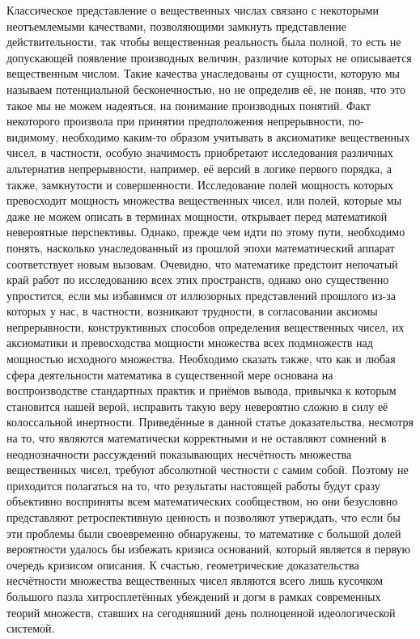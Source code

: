 \documentclass[12pt]{article}
\begin{document}
Классическое представление о вещественных числах связано с некоторыми неотъемлемыми качествами, позволяющими замкнуть представление действительности, так чтобы вещественная реальность была полной, то есть не допускающей появление производных величин, различие которых не описывается вещественным числом. Такие качества унаследованы от сущности, которую мы называем потенциальной бесконечностью, но не определив её, не поняв, что это такое мы не можем надеяться, на понимание производных понятий. Факт некоторого произвола при принятии предположения непрерывности, по-видимому, необходимо каким-то образом учитывать в аксиоматике вещественных чисел, в частности, особую значимость приобретают исследования различных альтернатив непрерывности, например, её версий в логике первого порядка, а также, замкнутости и совершенности. Исследование полей мощность которых превосходит мощность множества вещественных чисел, или полей, которые мы даже не можем описать в терминах мощности, открывает перед математикой невероятные перспективы. Однако, прежде чем идти по этому пути, необходимо понять, насколько унаследованный из прошлой эпохи математический аппарат соответствует новым вызовам. Очевидно, что математике предстоит непочатый край работ по исследованию всех этих пространств, однако оно существенно упростится, если мы избавимся от иллюзорных представлений прошлого из-за которых у нас, в частности, возникают трудности, в согласовании аксиомы непрерывности, конструктивных способов определения вещественных чисел, их аксиоматики и превосходства мощности множества всех подмножеств над мощностью исходного множества. Необходимо сказать также, что как и любая сфера деятельности математика в существенной мере основана на воспроизводстве стандартных практик и приёмов вывода, привычка к которым становится нашей верой, исправить такую веру невероятно сложно в силу её колоссальной инертности. Приведённые в данной статье доказательства, несмотря на то, что являются математически корректными и не оставляют сомнений в неоднозначности рассуждений показывающих несчётность множества вещественных чисел, требуют абсолютной честности с самим собой. Поэтому не приходится полагаться на то, что результаты настоящей работы будут сразу объективно восприняты всем математических сообществом, но они безусловно представляют ретроспективную ценность и позволяют утверждать, что если бы эти проблемы были своевременно обнаружены, то математике с большой долей вероятности удалось бы избежать кризиса оснований, который является в первую очередь кризисом описания. К счастью, геометрические доказательства несчётности множества вещественных чисел являются всего лишь кусочком большого пазла хитросплетённых убеждений и догм в рамках современных теорий множеств, ставших на сегодняшний день полноценной идеологической системой.
\end{document}
